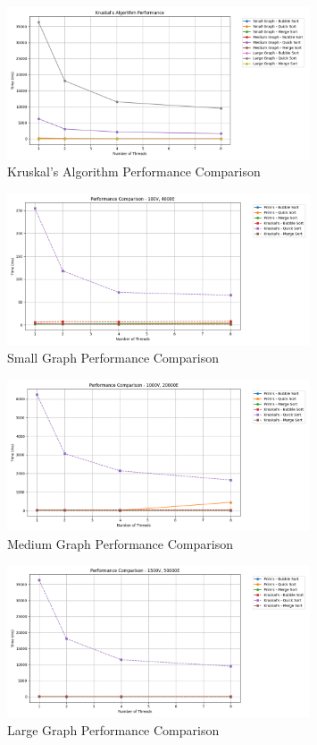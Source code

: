 \documentclass[11pt]{article}
\begin{document}
\begin{figure}[H]
    \centering
    \includegraphics[width=0.8\textwidth]{kruskals_comparison}
    \caption{Kruskal's Algorithm Performance Comparison}
    \label{fig:kruskals_comparison}
\end{figure}

\begin{figure}[H]
    \centering
    \includegraphics[width=0.8\textwidth]{small_comparison}
    \caption{Small Graph Performance Comparison}
    \label{fig:small_comparison}
\end{figure}

\begin{figure}[H]
    \centering
    \includegraphics[width=0.8\textwidth]{medium_comparison}
    \caption{Medium Graph Performance Comparison}
    \label{fig:medium_comparison}
\end{figure}

\begin{figure}[H]
    \centering
    \includegraphics[width=0.8\textwidth]{large_comparison}
    \caption{Large Graph Performance Comparison}
    \label{fig:large_comparison}
\end{figure}
\end{document}
